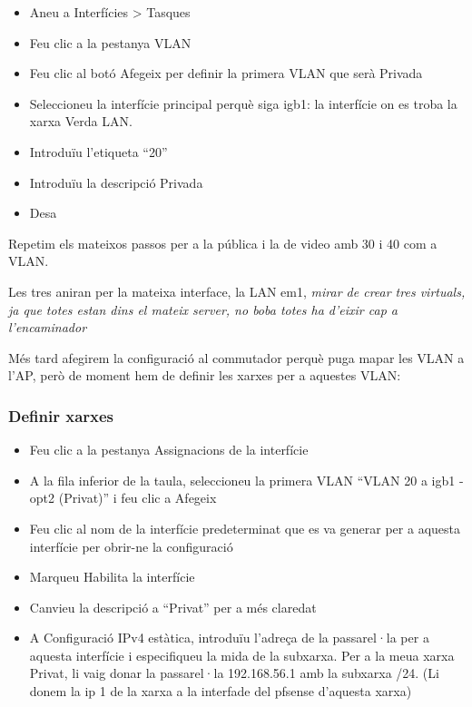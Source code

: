 \documentclass[
  10pt,
]{krantz}
\providecommand{\tightlist}{%
  \setlength{\itemsep}{0pt}\setlength{\parskip}{0pt}}
\begin{document}
\begin{itemize}
\tightlist
\item
  Aneu a Interfícies \textgreater{} Tasques
\item
  Feu clic a la pestanya VLAN
\item
  Feu clic al botó Afegeix per definir la primera VLAN que serà Privada
\item
  Seleccioneu la interfície principal perquè siga igb1: la interfície on es troba la xarxa Verda LAN.
\item
  Introduïu l'etiqueta ``20''
\item
  Introduïu la descripció Privada
\item
  Desa
\end{itemize}

Repetim els mateixos passos per a la pública i la de video amb 30 i 40 com a VLAN.

Les tres aniran per la mateixa interface, la LAN em1, \emph{mirar de crear tres virtuals, ja que totes estan dins el mateix server, no boba totes ha d'eixir cap a l'encaminador}

Més tard afegirem la configuració al commutador perquè puga mapar les VLAN a l'AP, però de moment hem de definir les xarxes per a aquestes VLAN:

\hypertarget{definir-xarxes}{%
\subsubsection{Definir xarxes}\label{definir-xarxes}}

\begin{itemize}
\tightlist
\item
  Feu clic a la pestanya Assignacions de la interfície
\item
  A la fila inferior de la taula, seleccioneu la primera VLAN ``VLAN 20 a igb1 - opt2 (Privat)'' i feu clic a Afegeix
\item
  Feu clic al nom de la interfície predeterminat que es va generar per a aquesta interfície per obrir-ne la configuració
\item
  Marqueu Habilita la interfície
\item
  Canvieu la descripció a ``Privat'' per a més claredat
\item
  A Configuració IPv4 estàtica, introduïu l'adreça de la passarel·la per a aquesta interfície i especifiqueu la mida de la subxarxa. Per a la meua xarxa Privat, li vaig donar la passarel·la 192.168.56.1 amb la subxarxa /24. (Li donem la ip 1 de la xarxa a la interfade del pfsense d'aquesta xarxa)
\end{itemize}
\end{document}
